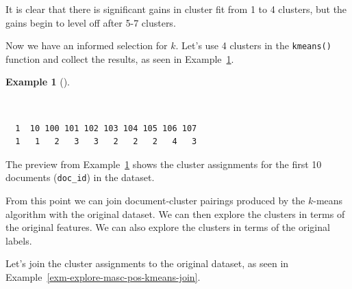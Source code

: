 \documentclass[
  letterpaper,
]{latex/krantz}
\newenvironment{Shaded}{\begin{snugshade}}{\end{snugshade}}
\newcommand{\AttributeTok}[1]{\textcolor[rgb]{0.00,0.00,0.00}{#1}}
\newcommand{\CommentTok}[1]{\textcolor[rgb]{0.00,0.00,0.00}{\textit{#1}}}
\newcommand{\DecValTok}[1]{\textcolor[rgb]{0.00,0.00,0.00}{#1}}
\newcommand{\FunctionTok}[1]{\textcolor[rgb]{0.00,0.00,0.00}{#1}}
\newcommand{\NormalTok}[1]{\textcolor[rgb]{0.00,0.00,0.00}{#1}}
\newcommand{\OtherTok}[1]{\textcolor[rgb]{0.00,0.00,0.00}{#1}}
\newcommand{\SpecialCharTok}[1]{\textcolor[rgb]{0.00,0.00,0.00}{#1}}
\theoremstyle{definition}
\newtheorem{example}{Example}[chapter]
\theoremstyle{remark}
\begin{document}
It is clear that there is significant gains in cluster fit from 1 to 4
clusters, but the gains begin to level off after 5-7 clusters.

Now we have an informed selection for \(k\). Let's use 4 clusters in the
\texttt{kmeans()} function and collect the results, as seen in
Example~\ref{exm-explore-masc-pos-kmeans-fit}.

\begin{example}[]\protect\hypertarget{exm-explore-masc-pos-kmeans-fit}{}\label{exm-explore-masc-pos-kmeans-fit}

~

\begin{Shaded}
\end{Shaded}

\begin{verbatim}
  1  10 100 101 102 103 104 105 106 107 
  1   1   2   3   3   2   2   2   4   3 
\end{verbatim}

\end{example}

The preview from Example~\ref{exm-explore-masc-pos-kmeans-fit} shows the
cluster assignments for the first 10 documents (\texttt{doc\_id}) in the
dataset.

From this point we can join document-cluster pairings produced by the
\(k\)-means algorithm with the original dataset. We can then explore the
clusters in terms of the original features. We can also explore the
clusters in terms of the original labels.

Let's join the cluster assignments to the original dataset, as seen in
Example~\ref{exm-explore-masc-pos-kmeans-join}.
\end{document}
